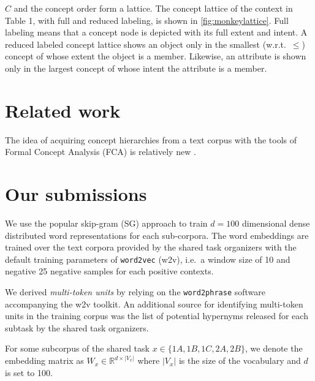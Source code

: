\documentclass[11pt,a4paper]{article}
\begin{document}
$C$ and the concept order form a %
lattice.  The concept lattice of the context in Table 1, with full and reduced
labeling, is shown in \ref{fig:monkeylattice}.
Full labeling means that a concept node is depicted with its full extent and
intent. A reduced labeled concept lattice shows an object only in the smallest
(w.r.t.~$\le$) concept of whose extent the object is a member.
Likewise, an attribute is shown only in the largest concept of whose intent the
attribute is a member.%

\section{Related work}

The idea of acquiring concept hierarchies from a text corpus with the tools of
Formal Concept Analysis (FCA) is relatively new \citep{Cimiano:2005}.

\section{Our submissions}

We use the popular skip-gram (SG) %
approach \citep{Mikolov:2013f} to train $d=100$ dimensional dense distributed
word representations for each sub-corpora. The word embeddings are trained over the text corpora provided by the shared task organizers with the default training parameters of \texttt{word2vec} (w2v), i.e.~a window size of 10 and negative 25 negative samples for each positive contexts.

We derived \emph{multi-token units} by relying on the \texttt{word2phrase} software accompanying the w2v toolkit. An additional source for identifying multi-token units in the training corpus was the list of potential hypernyms released for each subtask by the shared task organizers.

For some subcorpus of the shared task $x\in\{1A, 1B, 1C, 2A, 2B\}$, we denote
the embedding matrix as $W_x \in \mathbb{R}^{d \times \lvert V_x \rvert}$ where
$\lvert V_x \rvert$ is the size of the vocabulary and $d$ is set to 100.
\end{document}
